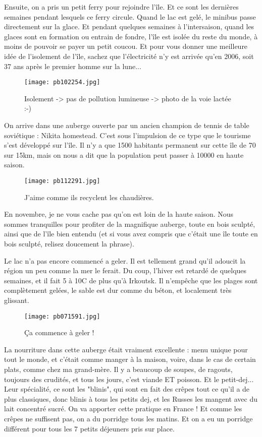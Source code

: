 \documentclass{book}
\begin{document}
Ensuite, on a pris un petit ferry pour rejoindre l'île. Et ce sont les dernières semaines pendant lesquels ce ferry circule. Quand le lac est gelé, le minibus passe directement sur la glace. Et pendant quelques semaines à l'intersaison, quand les glaces sont en formation ou entrain de fondre, l'île est isolée du reste du monde, à moins de pouvoir se payer un petit coucou. Et pour vous donner une meilleure idée de l'isolement de l'île, sachez que l'électricité n'y est arrivée qu'en 2006, soit 37 ans après le premier homme sur la lune...


\begin{figure}[h]
\centering
\texttt{[image: pb102254.jpg]}
\caption*{ Isolement -> pas de pollution lumineuse -> photo de la voie lactée :-)}
\end{figure}

On arrive dans une auberge ouverte par un ancien champion de tennis de table soviétique : Nikita homestead. C'est sous l'impulsion de ce type que le tourisme s'est développé sur l'île. Il n'y a que 1500 habitants permanent sur cette île de 70 sur 15km, mais on nous a dit que la population peut passer à 10000 en haute saison.


\begin{figure}[h]
\centering
\texttt{[image: pb112291.jpg]}
\caption*{ J'aime comme ils recyclent les chaudières.}
\end{figure}

En novembre, je ne vous cache pas qu'on est loin de la haute saison. Nous sommes tranquilles pour profiter de la magnifique auberge, toute en bois sculpté, ainsi que de l'île bien entendu (et si vous avez compris que c'était une île toute en bois sculpté, relisez doucement la phrase).

Le lac n'a pas encore commencé a geler. Il est tellement grand qu'il adoucit la région un peu comme la mer le ferait. Du coup, l'hiver est retardé de quelques semaines, et il fait 5 à 10\textdegree C de plus qu'à Irkoutsk. Il n'empêche que les plages sont complètement gelées, le sable est dur comme du béton, et localement très glissant.


\begin{figure}[h]
\centering
\texttt{[image: pb071591.jpg]}
\caption*{ Ça commence à geler !}
\end{figure}

La nourriture dans cette auberge était vraiment excellente : menu unique pour tout le monde, et c'était comme manger à la maison, voire, dans le cas de certain plats, comme chez ma grand-mère. Il y a beaucoup de soupes, de ragouts, toujours des crudités, et tous les jours, c'est viande ET poisson. Et le petit-dej... Leur spécialité, ce sont les "blinis", qui sont en fait des crêpes tout ce qu'il a de plus classiques, donc blinis à tous les petits dej, et les Russes les mangent avec du lait concentré sucré. On va apporter cette pratique en France ! Et comme les crêpes ne suffisent pas, on a du porridge tous les matins. Et on a eu un porridge différent pour tous les 7 petits déjeuners pris sur place.
\end{document}
